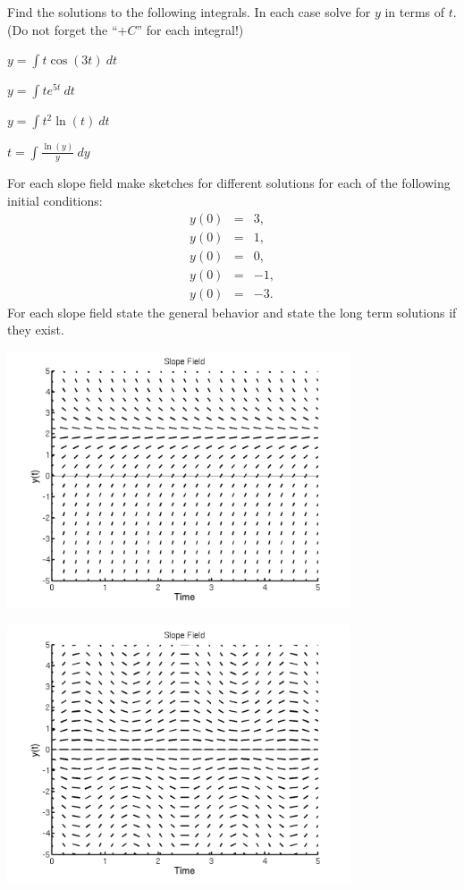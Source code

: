 \begin{problem}
\item Find the solutions to the following integrals. In each case
  solve for $y$ in terms of $t$. (Do not forget the ``$+C$'' for each
  integral!)
  \begin{subproblem}
    \item $y = \int t\cos(3t) ~ dt$
      \vfill
    \item $y = \int t e^{5t} ~ dt$
      \vfill
    \item $y = \int t^2 \ln(t) ~ dt$
      \vfill
    \item $t = \int \frac{\ln(y)}{y} ~ dy$
      \vfill
  \end{subproblem}

\clearpage

\item For each slope field make sketches for different solutions for
  each of the following initial conditions:
  \begin{eqnarray*}
    y(0) & = & 3, \\
    y(0) & = & 1, \\
    y(0) & = & 0, \\
    y(0) & = & -1, \\
    y(0) & = & -3.
  \end{eqnarray*}
  For each slope field state the general behavior and state the long
  term solutions if they exist.

  \begin{subproblem}
    \item \includegraphics[height=3.0in]{img/sfSteadyWk1}
    \item \includegraphics[height=3.0in]{img/sfOscillateWk1}


\end{subproblem}
\end{problem}
